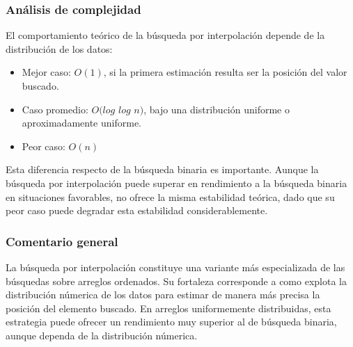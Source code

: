 \subsubsection{Análisis de complejidad}
El comportamiento teórico de la búsqueda por interpolación depende de la distribución de los datos:
\begin{itemize}
    \item Mejor caso: $O(1)$, si la primera estimación resulta ser la posición del valor buscado.
    \item Caso promedio: $O($$log$ $log$ $n)$, bajo una distribución uniforme o aproximadamente uniforme.
    \item Peor caso: $O(n)$
\end{itemize}

Esta diferencia respecto de la búsqueda binaria es importante. Aunque la búsqueda por interpolación puede superar en rendimiento a la búsqueda binaria en situaciones favorables, no ofrece la misma estabilidad teórica, dado que su peor caso puede degradar esta estabilidad considerablemente.

\subsubsection{Comentario general}
La búsqueda por interpolación constituye una variante más especializada de las búsquedas sobre arreglos ordenados. Su fortaleza corresponde a como explota la distribución númerica de los datos para estimar de manera más precisa la posición del elemento buscado. En arreglos uniformemente distribuidas, esta estrategia puede ofrecer un rendimiento muy superior al de búsqueda binaria, aunque dependa de la distribución númerica.